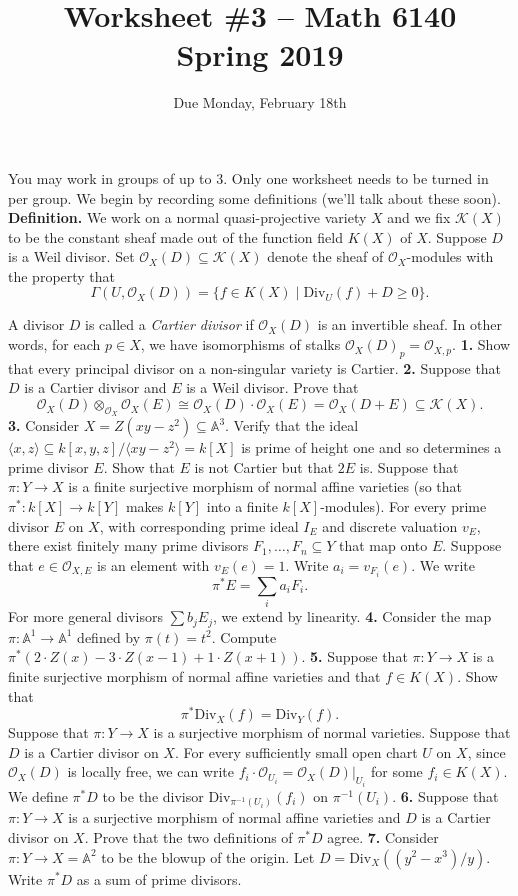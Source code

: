 \documentclass[11pt]{amsart}
\theoremstyle{theorem}
\renewcommand{\O}{\mathcal O}
\renewcommand{\to}[1][]{\xrightarrow{\ #1\ }}
\newcommand{\bA}{\mathbb{A}}
\newcommand{\cK}{\mathcal{K}}
\newcommand{\Div}{\mathrm{Div}}
\begin{document}
\title{Worksheet \#3 -- Math 6140\\Spring 2019}
\author{Due Monday, February 18th}

\maketitle
You may work in groups of up to 3.  Only one worksheet needs to be turned in per group.
\vskip 9pt
\noindent
We begin by recording some definitions (we'll talk about these soon).
\vskip 9pt
\noindent
{\bf Definition.}
We work on a normal quasi-projective variety $X$ and we fix $\cK(X)$ to be the constant sheaf made out of the function field $K(X)$ of $X$.
Suppose $D$ is a Weil divisor.  Set $\O_X(D) \subseteq \cK(X)$ denote the sheaf of $\O_X$-modules with the property that
\[
\Gamma(U, \O_X(D)) = \{f \in K(X) \;|\; \Div_U(f) + D \geq 0 \}.
\]

A divisor $D$ is called a \emph{Cartier divisor} if $\O_X(D)$ is an invertible sheaf.  In other words, for each $p \in X$, we have isomorphisms of stalks $\O_X(D)_p = \O_{X,p}$.
\vskip 12pt
\noindent
{\bf 1.}  Show that every principal divisor on a non-singular variety is Cartier.  
\vskip 180pt
\noindent
{\bf 2.}  Suppose that $D$ is a Cartier divisor and $E$ is a Weil divisor.  Prove that $$\O_X(D) \otimes_{\O_X} \O_X(E) \cong \O_X(D) \cdot \O_X(E) = \O_X(D+E) \subseteq \cK(X).$$
\newpage
\noindent
{\bf 3.}  Consider $X = Z(xy-z^2) \subseteq \bA^3$.  Verify that the ideal $\langle x, z \rangle \subseteq k[x,y,z]/\langle xy-z^2 \rangle = k[X]$ is prime of height one and so determines a prime divisor $E$.  Show that $E$ is not Cartier but that $2E$ is.
\vskip 200pt
Suppose that $\pi : Y \to X$ is a finite surjective morphism of normal affine varieties (so that $\pi^* : k[X] \to k[Y]$ makes $k[Y]$ into a finite $k[X]$-modules).  For every prime divisor $E$ on $X$, with corresponding prime ideal $I_E$ and discrete valuation $v_E$, there exist finitely many prime divisors $F_1, \dots, F_n \subseteq Y$ that map onto $E$.  Suppose that $e \in \O_{X, E}$ is an element with $v_E(e) = 1$.  Write $a_i = v_{F_i}(e)$.  We write
\[
\pi^* E = \sum_i a_i F_i.
\]
For more general divisors $\sum b_j E_j$, we extend by linearity.  
\vskip 12pt
\noindent
{\bf 4.}  Consider the map $\pi : \bA^1 \to \bA^1$ defined by $\pi(t) = t^2$.  Compute $\pi^* (2 \cdot Z(x) - 3 \cdot Z(x-1) + 1 \cdot Z(x+1))$.
\newpage
\noindent
{\bf 5.}  Suppose that $\pi : Y \to X$ is a finite surjective morphism of normal affine varieties and that $f \in K(X)$.  Show that 
\[
\pi^* \Div_X(f) = \Div_Y(f).
\]
\vskip 170pt
Suppose that $\pi : Y \to X$ is a surjective morphism of normal varieties.  Suppose that $D$ is a Cartier divisor on $X$.  For every sufficiently small open chart $U$ on $X$, since $\O_X(D)$ is locally free, we can write $f_i \cdot \O_{U_i} = \O_X(D)|_{U_i}$ for some $f_i \in K(X)$.  We define $\pi^* D$ to be the divisor $\Div_{\pi^{-1}(U_i)}(f_i)$ on $\pi^{-1}(U_i)$.
\vskip 12pt
\noindent
{\bf 6.}   Suppose that $\pi : Y \to X$ is a surjective morphism of normal affine varieties and $D$ is a Cartier divisor on $X$.  Prove that the two definitions of $\pi^* D$ agree.
\vskip 200pt
\noindent
{\bf 7.}  Consider $\pi : Y \to X = \bA^2$ to be the blowup of the origin.  Let $D = \Div_X( (y^2- x^3)/y)$.  Write $\pi^* D$ as a sum of prime divisors.  
\end{document}
